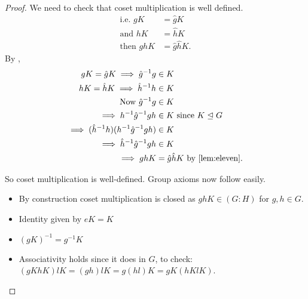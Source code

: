\begin{proof}
We need to check that coset multiplication is well defined.
\begin{align*}
    \text{i.e. } gK &= \hat{g}K \\
    \text{and } hK &= \hat{h}K \\
    \text{then } ghK &= \hat{g} \hat{h} K.
\end{align*}
By ,
\begin{align*}
    gK = \hat{g} K \implies \hat{g}^{-1} g &\in K \\
    hK = \hat{h} K \implies \hat{h}^{-1} h &\in K \\
    \text{Now } \hat{g}^{-1} g &\in K \\
    \implies h^{-1} \hat{g}^{-1} g h &\in K \text{ since } K \trianglelefteq G \\
    \implies (\hat{h}^{-1} h) (h^{-1} \hat{g}^{-1} g h) &\in K \\
    \implies \hat{h}^{-1}\hat{g}^{-1} g h &\in K \\
    \implies ghK &= \hat{g} \hat{h} K \text{ by \Cref{lem:eleven}.}
\end{align*} 

So coset multiplication is well-defined.
Group axioms now follow easily.

\begin{itemize}
\item
  By construction coset multiplication is closed as $ghK \in (G : H)$ for $g, h \in G$.
\item
  Identity given by $eK = K$
\item
  $(gK)^{-1} = g^{-1} K$
\item
  Associativity holds since it does in $G$, to check:
  $(gK hK) lK = (gh)l K = g(hl)K = gK (hK lK)$.
\end{itemize}

\end{proof}

